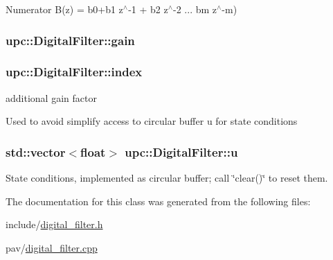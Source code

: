 Numerator B(z) = b0+b1 z$^\wedge$-\/1 + b2 z$^\wedge$-\/2 ... bm z$^\wedge$-\/m) 

\subsubsection[{\texorpdfstring{gain}{gain}}]{ upc\+::\+Digital\+Filter\+::gain\hspace{0.3cm}{\ttfamily [private]}}\hypertarget{classupc_1_1DigitalFilter_aaa94a0d08f87c98612d9471719bd773a}{}\label{classupc_1_1DigitalFilter_aaa94a0d08f87c98612d9471719bd773a}
\subsubsection[{\texorpdfstring{index}{index}}]{ upc\+::\+Digital\+Filter\+::index\hspace{0.3cm}{\ttfamily [private]}}\hypertarget{classupc_1_1DigitalFilter_ae2b58018045cfca38cad387dd4b82e83}{}\label{classupc_1_1DigitalFilter_ae2b58018045cfca38cad387dd4b82e83}


additional gain factor 

Used to avoid simplify access to circular buffer \textquotesingle{}u\textquotesingle{} for state conditions 
\subsubsection[{\texorpdfstring{u}{u}}]{\setlength{\rightskip}{0pt plus 5cm}std\+::vector$<${\bf float}$>$ upc\+::\+Digital\+Filter\+::u\hspace{0.3cm}{\ttfamily [private]}}\hypertarget{classupc_1_1DigitalFilter_ad8b8d1c7bde2fca050aa297b66d69179}{}\label{classupc_1_1DigitalFilter_ad8b8d1c7bde2fca050aa297b66d69179}


State conditions, implemented as circular buffer; call \char`\"{}clear()\char`\"{} to reset them. 



The documentation for this class was generated from the following files\+:\begin{DoxyCompactItemize}
\item 
include/\hyperlink{digital__filter_8h}{digital\+\_\+filter.\+h}\item 
pav/\hyperlink{digital__filter_8cpp}{digital\+\_\+filter.\+cpp}\end{DoxyCompactItemize}
